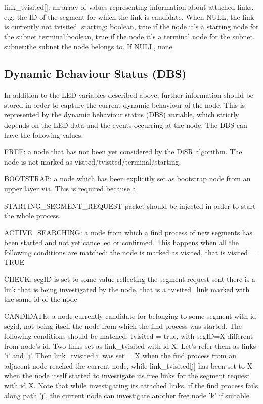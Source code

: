 \documentclass[conference]{IEEEtran}
\begin{document}
link\_tvisited[]: an array of
values representing information about attached links, e.g. the ID of
the segment for which the link is candidate. When NULL, the link is
currently not tvisited.  starting: boolean, true if the node it's a
starting node for the subnet terminal:boolean, true if the node it's a
terminal node for the subnet.  subnet:the subnet the node belongs to.
If NULL, none.


\subsection{Dynamic Behaviour Status (DBS)}
In addition to the LED variables
described above, further information should be stored in order to
capture the current dynamic behaviour of the node. This is represented
by the dynamic behaviour status (DBS) variable, which strictly depends
on the LED data and the events occurring at the node. The DBS can have
the following values:

FREE: a node that has  not been yet considered  by the DiSR algorithm.
The node is not marked as visited/tvisited/terminal/starting.

BOOTSTRAP: a node which has been explicitly set as bootstrap node from
an upper layer via. This is required because a

STARTING\_SEGMENT\_REQUEST packet should be injected in order to start
the whole process.

ACTIVE\_SEARCHING: a node from which a find process of new segments has
been started and not yet cancelled or confirmed. This happens when all
the following conditions are matched: the node is marked as visited,
that is visited = TRUE 

CHECK: segID is set to some value reflecting
the segment request sent there is a link that is being investigated by
the node, that is a tvisited\_link marked with the same id of the node 

CANDIDATE: a node currently candidate for belonging to some segment
with id segid, not being itself the node from which the find process
was started. The following conditions should be matched: tvisited =
true, with segID=X different from node's id.  Two links set as
link\_tvisited with id X. Let’s refer them as  links 'i' and 'j'. Then
link\_tvisited[i] was set = X when the find process from an adjacent
node reached the current node, while link\_tvisited[j] has been set to
X when the node itself started to investigate its free links for the
segment request with id X. Note that while investigating its attached
links, if the find process fails along path 'j', the current node can
investigate another free node 'k' if suitable.  
\end{document}

